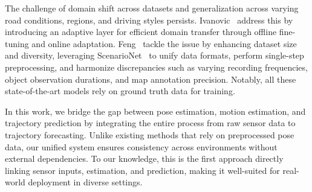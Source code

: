 The challenge of domain shift across datasets and generalization across varying road conditions, regions, and driving styles persists. Ivanovic~\etal\cite{ivanovic2023AdaptivePrediction} address this by introducing an adaptive layer for efficient domain transfer through offline fine-tuning and online adaptation. Feng~\etal\cite{feng2024unitraj} tackle the issue by enhancing dataset size and diversity, leveraging ScenarioNet~\cite{li2024scenarionet} to unify data formats, perform single-step preprocessing, and harmonize discrepancies such as varying recording frequencies, object observation durations, and map annotation precision. Notably, all these state-of-the-art models rely on ground truth data for training.

In this work, we bridge the gap between pose estimation, motion estimation, and trajectory prediction by integrating the entire process from raw sensor data to trajectory forecasting. Unlike existing methods that rely on preprocessed pose data, our unified system ensures consistency across environments without external dependencies. To our knowledge, this is the first approach directly linking sensor inputs, estimation, and prediction, making it well-suited for real-world deployment in diverse settings.